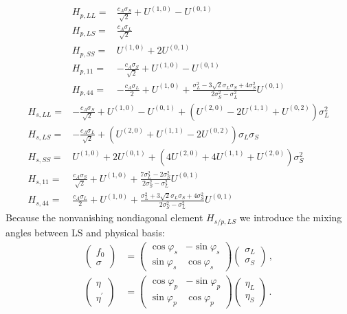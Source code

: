 \documentclass[12pt]{article}
\begin{document}
\begin{align}
H_{p,LL}=&\frac{c_A \sigma_S}{\sqrt{2}}+U^{(1,0)}-U^{(0,1)}\\
H_{p,LS}=&\frac{c_A \sigma_L}{\sqrt{2}}\\
H_{p,SS}=&U^{(1,0)}+2 U^{(0,1)}\\
H_{p,11}=&-\frac{c_A \sigma_S}{\sqrt{2}}+U^{(1,0)}-U^{(0,1)}\\
H_{p,44}=&- \frac{c_A \sigma_L}{2} + U^{(1,0)} + \frac{\sigma_L^2- 3 \sqrt{2} \sigma_L \sigma_S+4 \sigma_S^2}{2 \sigma_S^2-\sigma_L^2} U^{(0,1)}
\end{align}
\begin{align}
H_{s,LL}=&-\frac{c_A \sigma_S}{\sqrt{2}}+U^{(1,0)}-U^{(0,1)} +(U^{(2,0)} -2U^{(1,1)}+U^{(0,2)})\sigma_L^2\\
H_{s,LS}=&-\frac{c_A \sigma_L}{\sqrt{2}}+(U^{(2,0)}+U^{(1,1)}-2U^{(0,2)}) \sigma_L \sigma_S\\
H_{s,SS}=&U^{(1,0)}+2 U^{(0,1)} +(4 U^{(2,0)}+4U^{(1,1)}+U^{(2,0)})\sigma_S^2 \\
H_{s,11}=&\frac{c_A \sigma_S}{\sqrt{2}}+U^{(1,0)} +\frac{7 \sigma_L^2 - 2 \sigma_S^2}{2 \sigma_S^2-\sigma_L^2}U^{(0,1)}\\
H_{s,44}=&\frac{c_A \sigma_L}{2}+U^{(1,0)}+\frac{\sigma_L^2+3 \sqrt{2} \sigma_L\sigma_S+4 \sigma_S^2}{2 \sigma_S^2-\sigma_L^2}U^{(0,1)}
\end{align}
Because the nonvanishing nondiagonal element $H_{s/p,LS}$
we introduce the mixing angles between LS and physical basis:
\begin{align}\label{eq:plstrafo}
\begin{pmatrix}f_0 \\ \sigma \end{pmatrix} &= \begin{pmatrix} \cos\varphi_s & - \sin\varphi_s \\ \sin\varphi_s & \cos\varphi_s \end{pmatrix} \begin{pmatrix}\sigma_L \\ \sigma_S \end{pmatrix}\,,\\
\begin{pmatrix}\eta \\ \eta^\prime \end{pmatrix} &= \begin{pmatrix} \cos\varphi_p & - \sin\varphi_p \\ \sin\varphi_p & \cos\varphi_p \end{pmatrix} \begin{pmatrix}\eta_L \\ \eta_S \end{pmatrix}\,.
\end{align}
\end{document}
